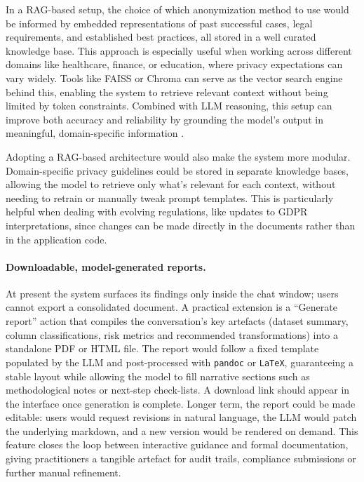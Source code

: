 \documentclass{article}
\begin{document}
In a RAG-based setup, the choice of which anonymization method to use would be informed by embedded representations of past successful cases, legal requirements, and established best practices, all stored in a well curated knowledge base. This approach is especially useful when working across different domains like healthcare, finance, or education, where privacy expectations can vary widely. Tools like FAISS \cite{faiss2023} or Chroma can serve as the vector search engine behind this, enabling the system to retrieve relevant context without being limited by token constraints. Combined with LLM reasoning, this setup can improve both accuracy and reliability by grounding the model’s output in meaningful, domain-specific information \cite{llm_content_analysis}.

Adopting a RAG-based architecture would also make the system more modular. Domain-specific privacy guidelines could be stored in separate knowledge bases, allowing the model to retrieve only what’s relevant for each context, without needing to retrain or manually tweak prompt templates. This is particularly helpful when dealing with evolving regulations, like updates to GDPR interpretations, since changes can be made directly in the documents rather than in the application code.

\paragraph{Downloadable, model-generated reports.}
At present the system surfaces its findings only inside the chat window; users cannot export a consolidated document.  
A practical extension is a “Generate report” action that compiles the conversation’s key artefacts (dataset summary, column classifications, risk metrics and recommended transformations) into a standalone PDF or HTML file.  
The report would follow a fixed template populated by the LLM and post-processed with \texttt{pandoc} or \texttt{LaTeX}, guaranteeing a stable layout while allowing the model to fill narrative sections such as methodological notes or next-step check-lists.  
A download link should appear in the interface once generation is complete.  
Longer term, the report could be made editable: users would request revisions in natural language, the LLM would patch the underlying markdown, and a new version would be rendered on demand.  
This feature closes the loop between interactive guidance and formal documentation, giving practitioners a tangible artefact for audit trails, compliance submissions or further manual refinement.
\end{document}
